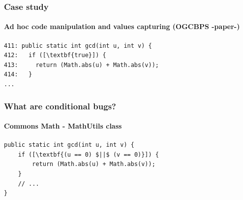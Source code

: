 \documentclass[onlymath]{beamer}
\begin{document}
 \begin{frame}[fragile]
    \frametitle{Case study}
      \framesubtitle{Ad hoc code manipulation and values capturing (OGCBPS -paper-)}
\begin{lstlisting}[escapeinside=\[\]]
411: public static int gcd(int u, int v) {
412:   if ([\textbf{true}]) {
413:     return (Math.abs(u) + Math.abs(v));
414:   }
...
\end{lstlisting}
\end{frame}

 \begin{frame}[fragile]
    \frametitle{What are conditional bugs?}
    \framesubtitle{Commons Math - MathUtils class}
        \begin{lstlisting}[escapeinside=\[\]]
public static int gcd(int u, int v) {
    if ([\textbf{(u == 0) $||$ (v == 0)}]) {
        return (Math.abs(u) + Math.abs(v));
    }
    // ...
}
	\end{lstlisting}
\end{frame}
\end{document}
